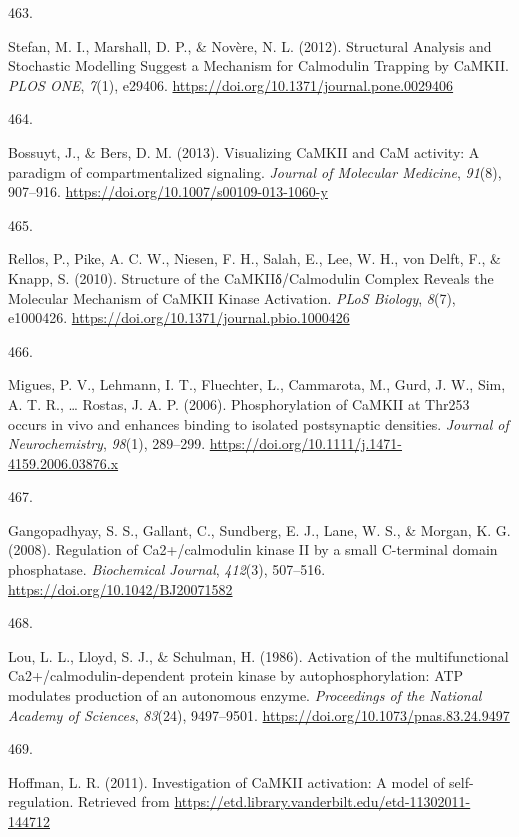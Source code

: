 \documentclass[
  11pt,
  letterpaper,
]{scrreprt}
\newlength{\cslhangindent}
\newlength{\csllabelwidth}
\newenvironment{CSLReferences}[2] %
 {\begin{list}{}{%
  \setlength{\itemindent}{0pt}
  \setlength{\leftmargin}{0pt}
  \setlength{\parsep}{0pt}
  \ifodd #1
   \setlength{\leftmargin}{\cslhangindent}
   \setlength{\itemindent}{-1\cslhangindent}
  \fi
  \setlength{\itemsep}{#2\baselineskip}}}
 {\end{list}}
\newcommand{\CSLLeftMargin}[1]{\parbox[t]{\csllabelwidth}{\strut#1\strut}}
\newcommand{\CSLRightInline}[1]{\parbox[t]{\linewidth - \csllabelwidth}{\strut#1\strut}}
\begin{document}
\begin{CSLReferences}{0}{0}
\CSLLeftMargin{463. }%
\CSLRightInline{Stefan, M. I., Marshall, D. P., \& Novère, N. L. (2012).
Structural {Analysis} and {Stochastic Modelling Suggest} a {Mechanism}
for {Calmodulin Trapping} by {CaMKII}. \emph{PLOS ONE}, \emph{7}(1),
e29406. \url{https://doi.org/10.1371/journal.pone.0029406}}

\CSLLeftMargin{464. }%
\CSLRightInline{Bossuyt, J., \& Bers, D. M. (2013). Visualizing {CaMKII}
and {CaM} activity: A paradigm of compartmentalized signaling.
\emph{Journal of Molecular Medicine}, \emph{91}(8), 907--916.
\url{https://doi.org/10.1007/s00109-013-1060-y}}

\CSLLeftMargin{465. }%
\CSLRightInline{Rellos, P., Pike, A. C. W., Niesen, F. H., Salah, E.,
Lee, W. H., von Delft, F., \& Knapp, S. (2010). Structure of the
{CaMKIIδ}/{Calmodulin Complex Reveals} the {Molecular Mechanism} of
{CaMKII Kinase Activation}. \emph{PLoS Biology}, \emph{8}(7), e1000426.
\url{https://doi.org/10.1371/journal.pbio.1000426}}

\CSLLeftMargin{466. }%
\CSLRightInline{Migues, P. V., Lehmann, I. T., Fluechter, L., Cammarota,
M., Gurd, J. W., Sim, A. T. R., \ldots{} Rostas, J. A. P. (2006).
Phosphorylation of {CaMKII} at {Thr253} occurs in vivo and enhances
binding to isolated postsynaptic densities. \emph{Journal of
Neurochemistry}, \emph{98}(1), 289--299.
\url{https://doi.org/10.1111/j.1471-4159.2006.03876.x}}

\CSLLeftMargin{467. }%
\CSLRightInline{Gangopadhyay, S. S., Gallant, C., Sundberg, E. J., Lane,
W. S., \& Morgan, K. G. (2008). Regulation of {Ca2}+/calmodulin kinase
{II} by a small {C-terminal} domain phosphatase. \emph{Biochemical
Journal}, \emph{412}(3), 507--516.
\url{https://doi.org/10.1042/BJ20071582}}

\CSLLeftMargin{468. }%
\CSLRightInline{Lou, L. L., Lloyd, S. J., \& Schulman, H. (1986).
Activation of the multifunctional {Ca2}+/calmodulin-dependent protein
kinase by autophosphorylation: {ATP} modulates production of an
autonomous enzyme. \emph{Proceedings of the National Academy of
Sciences}, \emph{83}(24), 9497--9501.
\url{https://doi.org/10.1073/pnas.83.24.9497}}

\CSLLeftMargin{469. }%
\CSLRightInline{Hoffman, L. R. (2011). Investigation of {CaMKII}
activation: A model of self-regulation. Retrieved from
\url{https://etd.library.vanderbilt.edu/etd-11302011-144712}}


\end{CSLReferences}
\end{document}
